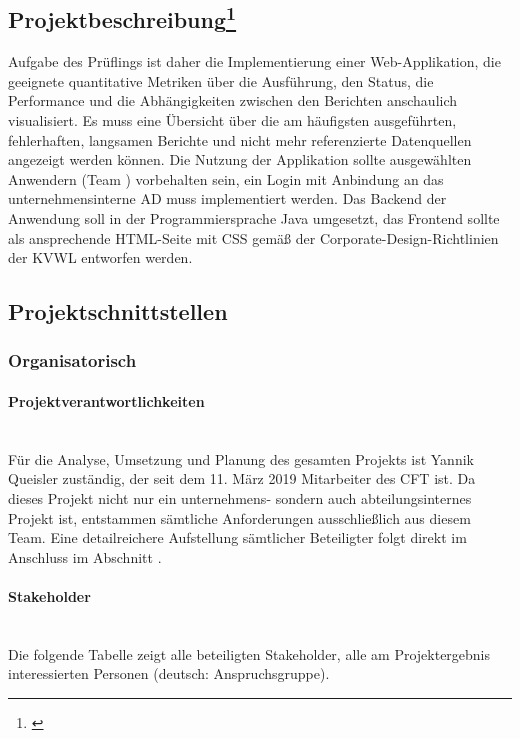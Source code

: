\subsection[Projektbeschreibung]{Projektbeschreibung\footnote{\cite{Projektantrag}}} 
\label{sec:Projektbeschreibung}
\begin{displayquote}
	Aufgabe des Prüflings \autorName\xspace ist daher die Implementierung einer Web-Applikation, die geeignete quantitative Metriken über die Ausführung, den Status, die Performance und die Abhängigkeiten zwischen den Berichten anschaulich visualisiert. Es muss eine Übersicht über die am häufigsten ausgeführten, fehlerhaften, langsamen Berichte und nicht mehr referenzierte Datenquellen angezeigt werden können. Die Nutzung der Applikation sollte ausgewählten Anwendern (Team \teamName) vorbehalten sein, \dahe ein Login mit Anbindung an das unternehmensinterne \ac{AD} muss implementiert werden. Das Backend der Anwendung soll in der Programmiersprache Java umgesetzt, das Frontend sollte als ansprechende HTML-Seite mit CSS gemäß der Corporate-Design-Richtlinien der \ac{KVWL} entworfen werden.
\end{displayquote}

\subsection{Projektschnittstellen} 
\label{sec:Projektschnittstellen}

\subsubsection{Organisatorisch} 
\label{sec:Projektschnittstellen:Organisatorisch}

\paragraph{Projektverantwortlichkeiten} ~\\
\label{p:Projektverantwortlichkeiten}
Für die Analyse, Umsetzung und Planung des gesamten Projekts ist Yannik Queisler zuständig, der seit dem 11. März 2019 Mitarbeiter des \ac{CFT} \teamName ist. Da dieses Projekt nicht nur ein unternehmens- sondern auch abteilungsinternes Projekt ist, entstammen sämtliche Anforderungen ausschließlich aus diesem Team. Eine detailreichere Aufstellung sämtlicher Beteiligter folgt direkt im Anschluss im Abschnitt .

\paragraph{Stakeholder} ~\\
\label{p:Stakeholder}
Die folgende Tabelle zeigt alle beteiligten Stakeholder, \dahe alle am Projektergebnis interessierten Personen (deutsch: Anspruchsgruppe).

